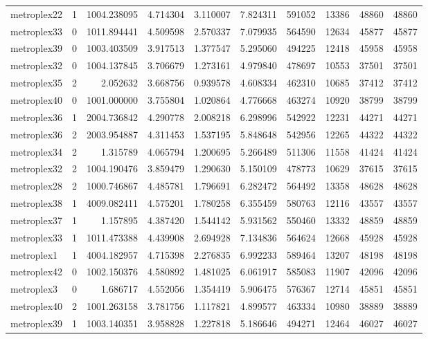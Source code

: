 \documentclass[../../../thesis.tex]{subfiles}
\begin{document}
\begin{longtable}{|l|r|r|r|r|r|r|r|r|r|}
metroplex22 & 1 & 1004.238095 & 4.714304 & 3.110007 & 7.824311 & 591052 & 13386 & 48860 & 48860 \\
metroplex33 & 0 & 1011.894441 & 4.509598 & 2.570337 & 7.079935 & 564590 & 12634 & 45877 & 45877 \\
metroplex39 & 0 & 1003.403509 & 3.917513 & 1.377547 & 5.295060 & 494225 & 12418 & 45958 & 45958 \\
metroplex32 & 0 & 1004.137845 & 3.706679 & 1.273161 & 4.979840 & 478697 & 10553 & 37501 & 37501 \\
metroplex35 & 2 & 2.052632 & 3.668756 & 0.939578 & 4.608334 & 462310 & 10685 & 37412 & 37412 \\
metroplex40 & 0 & 1001.000000 & 3.755804 & 1.020864 & 4.776668 & 463274 & 10920 & 38799 & 38799 \\
metroplex36 & 1 & 2004.736842 & 4.290778 & 2.008218 & 6.298996 & 542922 & 12231 & 44271 & 44271 \\
metroplex36 & 2 & 2003.954887 & 4.311453 & 1.537195 & 5.848648 & 542956 & 12265 & 44322 & 44322 \\
metroplex34 & 2 & 1.315789 & 4.065794 & 1.200695 & 5.266489 & 511306 & 11558 & 41424 & 41424 \\
metroplex32 & 2 & 1004.190476 & 3.859479 & 1.290630 & 5.150109 & 478773 & 10629 & 37615 & 37615 \\
metroplex28 & 2 & 1000.746867 & 4.485781 & 1.796691 & 6.282472 & 564492 & 13358 & 48628 & 48628 \\
metroplex38 & 1 & 4009.082411 & 4.575201 & 1.780258 & 6.355459 & 580763 & 12116 & 43557 & 43557 \\
metroplex37 & 1 & 1.157895 & 4.387420 & 1.544142 & 5.931562 & 550460 & 13332 & 48859 & 48859 \\
metroplex33 & 1 & 1011.473388 & 4.439908 & 2.694928 & 7.134836 & 564624 & 12668 & 45928 & 45928 \\
metroplex1 & 1 & 4004.182957 & 4.715398 & 2.276835 & 6.992233 & 589464 & 13207 & 48198 & 48198 \\
metroplex42 & 0 & 1002.150376 & 4.580892 & 1.481025 & 6.061917 & 585083 & 11907 & 42096 & 42096 \\
metroplex3 & 0 & 1.686717 & 4.552056 & 1.354419 & 5.906475 & 576367 & 12714 & 45851 & 45851 \\
metroplex40 & 2 & 1001.263158 & 3.781756 & 1.117821 & 4.899577 & 463334 & 10980 & 38889 & 38889 \\
metroplex39 & 1 & 1003.140351 & 3.958828 & 1.227818 & 5.186646 & 494271 & 12464 & 46027 & 46027 \\

\end{longtable}
\end{document}
